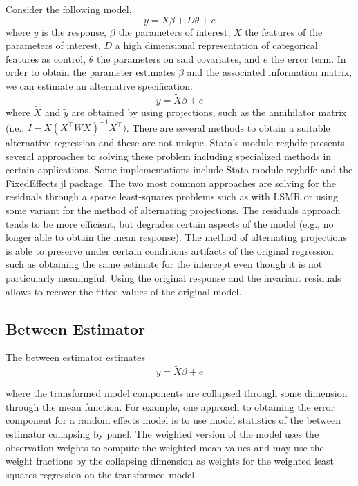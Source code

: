 \documentclass{juliacon}
\begin{document}
Consider the following model,
\begin{equation}
	y = X \beta + D \theta + e
\end{equation}
where $y$ is the response, $\beta$ the parameters of interest, $X$ the features of the parameters of interest, $D$ a high dimensional representation of categorical features as control, $\theta$ the parameters on said covariates, and $e$ the error term. In order to obtain the parameter estimates $\beta$ and the associated information matrix, we can estimate an alternative specification.
\begin{equation}
	\tilde{y} = \tilde{X} \beta + e
\end{equation}
where $\tilde{X}$ and $\tilde{y}$ are obtained by using projections, such as the annihilator matrix (i.e., $I - X \left(X^{\top}W X\right)^{-1} X^{\top})$. There are several methods to obtain a suitable alternative regression and these are not unique. Stata's module reghdfe \cite{reghdfe} presents several approaches to solving these problem including specialized methods in certain applications. Some implementations include Stata module reghdfe and the FixedEffects.jl package. The two most common approaches are solving for the residuals through a sparse least-squares problems such as with LSMR \cite{LSMR} or using some variant for the method of alternating projections. The residuals approach tends to be more efficient, but degrades certain aspects of the model (e.g., no longer able to obtain the mean response). The method of alternating projections is able to preserve under certain conditions artifacts of the original regression such as obtaining the same estimate for the intercept even though it is not particularly meaningful. Using the original response and the invariant residuals allows to recover the fitted values of the original model.

\subsection{Between Estimator}

The between estimator estimates
\begin{equation}
	\tilde{y} = \tilde{X} \beta + e
\end{equation}

where the transformed model components are collapsed through some dimension through the mean function. For example, one approach to obtaining the error component for a random effects model is to use model statistics of the between estimator collapsing by panel. The weighted version of the model uses the observation weights to compute the weighted mean values and may use the weight fractions by the collapsing dimension as weights for the weighted least squares regression on the transformed model.
\end{document}
